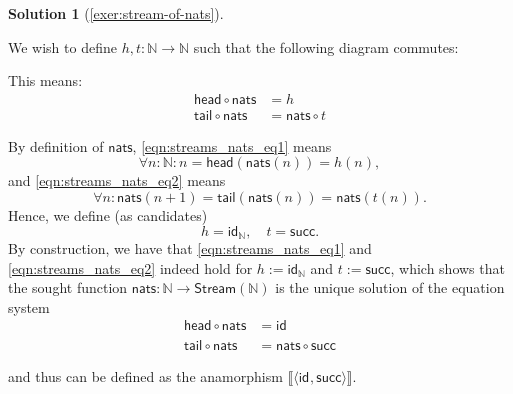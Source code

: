 \documentclass[a4paper,11pt, oneside,titlepage=false]{scrbook}
\theoremstyle{plain}
\theoremstyle{definition}
\newtheorem{solution}[thm]{Solution}
\newcommand{\cfont}[1]{\ensuremath{\mathsf{#1}}}
\newcommand{\Id}[1][]{\cfont{id}_{#1}}
\newcommand{\anam}[1]{\llbracket #1 \rrbracket} %
\newcommand{\co}[2]{\ensuremath{#2 \circ #1}}
\newcommand{\NN}{\ensuremath{\mathbb{N}}}
\newcommand{\Succ}{\ensuremath{\mathsf{succ}}}
\newcommand{\Stream}{\ensuremath{\mathsf{Stream}}}
\newcommand{\tail}{\ensuremath{\mathsf{tail}}}
\newcommand{\head}{\ensuremath{\mathsf{head}}}
\newcommand{\nats}{\ensuremath{\mathsf{nats}}}
\begin{document}
\begin{solution}[\cref{exer:stream-of-nats}]\label{sol:stream-of-nats}

	We wish to define $h,t : \NN\to \NN$ such that the following diagram commutes:
	\begin{center}
	\end{center}

	This means:
	\begin{align}
	\co{\nats}{\head} &= h \label{eqn:streams_nats_eq1} \\
	\co{\nats}{\tail} &= \co{t}{\nats} \label{eqn:streams_nats_eq2}
	\end{align}

	By definition of $\nats$, \cref{eqn:streams_nats_eq1} means
	\[
	\forall n : \NN: n = \head(\nats(n)) = h(n),
	\]
	and \cref{eqn:streams_nats_eq2} means
	\[
	\forall n : \nats(n+1) = \tail(\nats(n)) = \nats(t(n)).
	\]
	Hence, we define (as candidates)
	\[
	h = \Id[\NN], \quad t = \Succ.
	\]
	By construction, we have that \cref{eqn:streams_nats_eq1} and \cref{eqn:streams_nats_eq2} indeed hold for $h := \Id[\NN]$ and $t := \Succ$, which shows that the sought function $\nats : \NN \to \Stream(\NN)$ is the unique solution of the equation system
  \begin{align*}
    \co {\nats} \head  &= \Id
    \\
    \co {\nats} \tail &= \co \Succ {\nats}
  \end{align*}

  and thus can be defined as the anamorphism $\anam{ \langle \Id, \Succ \rangle }$.
\end{solution}
\end{document}
